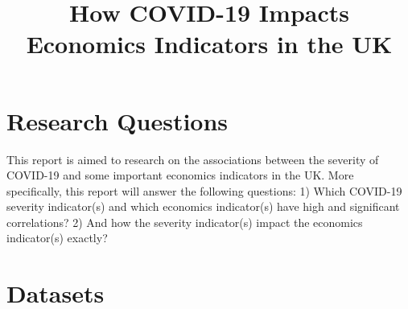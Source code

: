 \documentclass[12pt, a4paper]{report}
\title{How COVID-19 Impacts Economics Indicators in the UK}
\author{}
\date{}
\begin{document}
\maketitle

\section{Research Questions}
This report is aimed to research on the associations between the severity of COVID-19 and some important 
economics indicators in the UK. More specifically, this report will answer the following questions:
1) Which COVID-19 severity indicator(s) and which economics indicator(s) have high and significant correlations?
2) And how the severity indicator(s) impact the economics indicator(s) exactly?


\section{Datasets}
\end{document}
